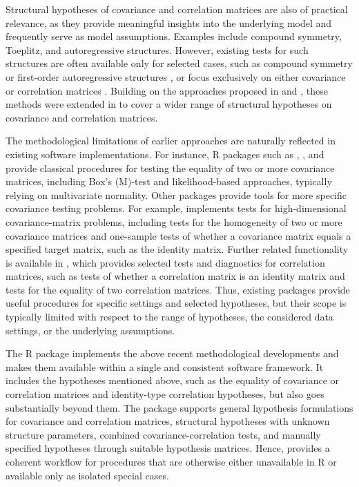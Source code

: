 Structural hypotheses of covariance and correlation matrices are also of
practical relevance, as they provide meaningful insights into the underlying
model and frequently serve as model assumptions. Examples include compound
symmetry, Toeplitz, and autoregressive structures. However, existing tests for
such structures are often available only for selected cases, such as compound
symmetry \citep{winer1991, votaw1948} or first-order
autoregressive structures \citep{mckeown1996}, or focus exclusively on
either covariance or correlation matrices \citep{steiger1980}. Building on
the approaches proposed in \citet{sattler2022} and \citet{sattler2023},
these methods were extended in \citet{sattler2024a} to cover a wider range of
structural hypotheses on covariance and correlation matrices.

The methodological limitations of earlier approaches are naturally reflected in
existing software implementations. For instance, R packages such as
, , and  provide classical
procedures for testing the equality of two or more covariance matrices,
including Box's (M)-test and likelihood-based approaches, typically relying on
multivariate normality. Other packages provide tools for more specific
covariance testing problems. For example, 
\citep{Barnard2018} implements tests for high-dimensional covariance-matrix
problems, including tests for the homogeneity of two or more covariance matrices
and one-sample tests of whether a covariance matrix equals a specified target
matrix, such as the identity matrix. Further related functionality is available
in  \citep{Revelle2019}, which provides selected tests and
diagnostics for correlation matrices, such as tests of whether a correlation
matrix is an identity matrix and tests for the equality of two correlation
matrices. Thus, existing packages provide useful procedures for specific
settings and selected hypotheses, but their scope is typically limited with
respect to the range of hypotheses, the considered data settings, or the
underlying assumptions.

The R package  \citep{covcortest} implements the above
recent methodological developments and makes them available within a single and
consistent software framework. It includes the hypotheses mentioned above, such
as the equality of covariance or correlation matrices and identity-type
correlation hypotheses, but also goes substantially beyond them. The package
supports general hypothesis formulations for covariance and correlation
matrices, structural hypotheses with unknown structure parameters, combined
covariance-correlation tests, and manually specified hypotheses through suitable
hypothesis matrices. Hence,  provides a coherent workflow for
procedures that are otherwise either unavailable in R or available only as
isolated special cases.

